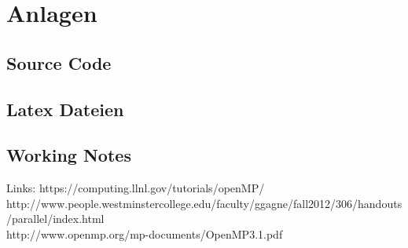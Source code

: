 \documentclass{lni}
\begin{document}
\listoffigures

\listoftables

\section{Anlagen}
\setcounter{subsection}{0} %
\minitoc

\nomtcpagenumbers %

\subsection{Source Code}

\subsection{Latex Dateien}


\subsection{Working Notes}
Links: 
https://computing.llnl.gov/tutorials/openMP/ \\
http://www.people.westminstercollege.edu/faculty/ggagne/fall2012/306/handouts/parallel/index.html \\
http://www.openmp.org/mp-documents/OpenMP3.1.pdf \\
\end{document}
